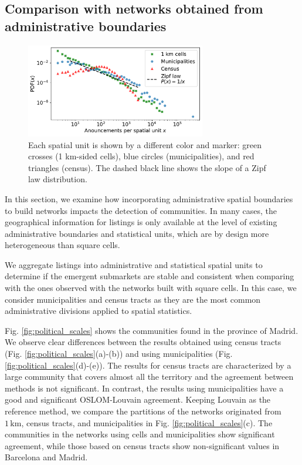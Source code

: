 \subsection{Comparison with networks obtained from administrative boundaries}\label{sec:political spatial units}

\begin{figure}
    \centering
    \includegraphics[width = 0.7\textwidth]{Figs/Idealista_segmentation/Distribution_adds_census_cell.pdf}
	\caption[Distribution of listings for different spatial units.]{ Each spatial unit is shown by a different color and marker: green crosses (1 km-sided cells), blue circles (municipalities), and red triangles (census). The dashed black line shows the slope of a Zipf law distribution. \label{fig:distribution_announcements}}
\end{figure}

In this section, we examine how incorporating administrative spatial boundaries to build networks impacts the detection of communities. In many cases, the geographical information for listings is only available at the level of existing administrative boundaries and statistical units, which are by design more heterogeneous than square cells.

We aggregate listings into administrative and statistical spatial units to determine if the emergent submarkets are stable and consistent when comparing with the ones observed with the networks built with square cells. In this case, we consider municipalities and census tracts as they are the most common administrative divisions applied to spatial statistics. 

Fig. \ref{fig:political_scales} shows the communities found in the province of Madrid. We observe clear differences between the results obtained using census tracts (Fig. \ref{fig:political_scales}(a)-(b)) and using municipalities (Fig. \ref{fig:political_scales}(d)-(e)). The results for census tracts are characterized by a large community that covers almost all the territory and the agreement between methods is not significant. In contrast, the results using municipalities have a good and significant OSLOM-Louvain agreement. Keeping Louvain as the reference method, we compare the partitions of the networks originated from $1  \, \textrm{km}$, census tracts, and municipalities in Fig. \ref{fig:political_scales}(c). The communities in the networks using cells and municipalities show significant agreement, while those based on census tracts show non-significant values in Barcelona and Madrid.

